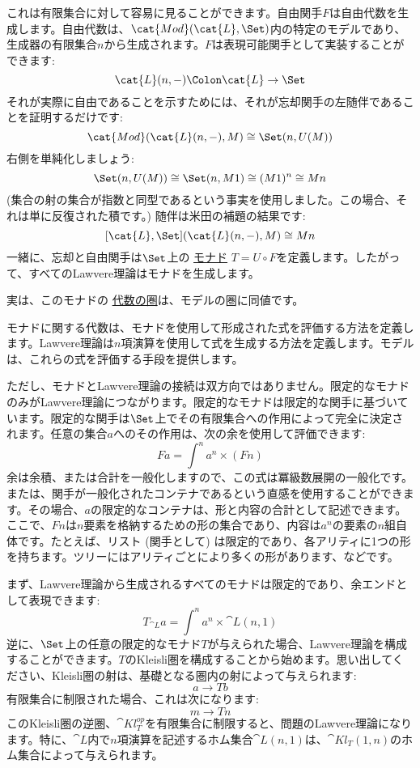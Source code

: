 これは有限集合に対して容易に見ることができます。自由関手$F$は自由代数を生成します。自由代数は、$\cat{Mod}(\cat{L}, \Set)$内の特定のモデルであり、生成器の有限集合$n$から生成されます。$F$は表現可能関手として実装することができます: 
\[\cat{L}(n, -) \Colon \cat{L} \to \Set\]
それが実際に自由であることを示すためには、それが忘却関手の左随伴であることを証明するだけです: 
\[\cat{Mod}(\cat{L}(n, -), M) \cong \Set(n, U(M))\]
右側を単純化しましょう: 
\[\Set(n, U(M)) \cong \Set(n, M 1) \cong (M 1)^n \cong M n\]
 (集合の射の集合が指数と同型であるという事実を使用しました。この場合、それは単に反復された積です。) 随伴は米田の補題の結果です: 
\[[\cat{L}, \Set](\cat{L}(n, -), M) \cong M n\]
一緒に、忘却と自由関手は$\Set$上の
\hyperref[monads-categorically]{モナド}
$T = U \circ F$を定義します。したがって、すべてのLawvere理論はモナドを生成します。

実は、このモナドの
\hyperref[algebras-for-monads]{代数の圏}は、モデルの圏に同値です。

モナドに関する代数は、モナドを使用して形成された式を評価する方法を定義します。Lawvere理論は$n$項演算を使用して式を生成する方法を定義します。モデルは、これらの式を評価する手段を提供します。

ただし、モナドとLawvere理論の接続は双方向ではありません。限定的なモナドのみがLawvere理論につながります。限定的なモナドは限定的な関手に基づいています。限定的な関手は$\Set$上でその有限集合への作用によって完全に決定されます。任意の集合$a$へのその作用は、次の余を使用して評価できます: 
\[F a = \int^n a^n \times (F n)\]
余は余積、または合計を一般化しますので、この式は冪級数展開の一般化です。または、関手が一般化されたコンテナであるという直感を使用することができます。その場合、$a$の限定的なコンテナは、形と内容の合計として記述できます。ここで、$F n$は$n$要素を格納するための形の集合であり、内容は$a^n$の要素の$n$組自体です。たとえば、リスト (関手として) は限定的であり、各アリティに1つの形を持ちます。ツリーにはアリティごとにより多くの形があります、などです。

まず、Lawvere理論から生成されるすべてのモナドは限定的であり、余エンドとして表現できます: 
\[T_{\cat{L}} a = \int^n a^n \times \cat{L}(n, 1)\]
逆に、$\Set$上の任意の限定的なモナド$T$が与えられた場合、Lawvere理論を構成することができます。$T$のKleisli圏を構成することから始めます。思い出してください、Kleisli圏の射は、基礎となる圏内の射によって与えられます: 
\[a \to T b\]
有限集合に制限された場合、これは次になります: 
\[m \to T n\]
このKleisli圏の逆圏、$\cat{Kl}^\mathit{op}_{T}$を有限集合に制限すると、問題のLawvere理論になります。特に、$\cat{L}$内で$n$項演算を記述するホム集合$\cat{L}(n, 1)$は、$\cat{Kl}_{T}(1, n)$のホム集合によって与えられます。

